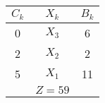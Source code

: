 \begin{tabular}{ccc}
\hline
\hline
$C_k$  & $X_k$  & $B_k$ \bigstrut\\
\hline
0      & $X_3$  & 6 \bigstrut[t]\\
2      & $X_2$  & 2 \\
5      & $X_1$  & 11 \bigstrut[b]\\
\hline
       & $Z=59$ &  \bigstrut\\
\hline
\hline
\end{tabular}%
